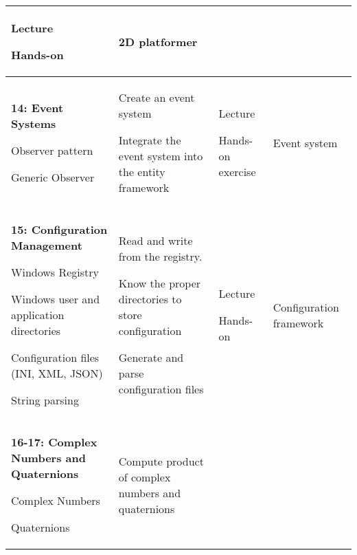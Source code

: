 \documentclass[10pt]{article}
\newenvironment{itemize*}{
\begin{itemize}[leftmargin=1em,noitemsep,nolistsep]
}{\end{itemize}}
\begin{document}
\begin{longtable}{||p{1.8in}|p{2.4in}|p{1.3in}|p{1in}||}
\begin{itemize*}
		\item Lecture
		\item Hands-on
	\end{itemize*} & 2D platformer \\ \hline
\textbf{14: Event Systems}
	\begin{itemize*}
		\item Observer pattern
		\item Generic Observer
	\end{itemize*} &
	\begin{itemize*}
		\item Create an event system
		\item Integrate the event system into the entity framework
	\end{itemize*} &
	\begin{itemize*}
		\item Lecture
		\item Hands-on exercise
	\end{itemize*} & Event system\\ \hline
\textbf{15: Configuration Management}
	\begin{itemize*}
		\item Windows Registry
		\item Windows user and application directories
		\item Configuration files (INI, XML, JSON)
		\item String parsing
	\end{itemize*} &
	\begin{itemize*}
		\item Read and write from the registry.
		\item Know the proper directories to store configuration
		\item Generate and parse configuration files
	\end{itemize*} &
	\begin{itemize*}
		\item Lecture
		\item Hands-on
	\end{itemize*} & Configuration framework \\ \hline
\textbf{16-17: Complex Numbers and Quaternions}
	\begin{itemize*}
		\item Complex Numbers
		\item Quaternions
	\end{itemize*} &
	\begin{itemize*}
		\item Compute product of complex numbers and quaternions

\end{itemize*}
\end{longtable}
\end{document}
